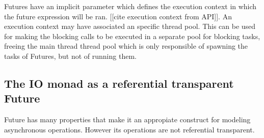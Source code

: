 \documentclass[../main.tex]{subfiles}
\begin{document}
Futures have an implicit parameter which defines the execution context in which
the future expression will be ran. [[cite execution context from API]]. An
execution context may have associated an specific thread pool. This can be used
for making the blocking calls to be executed in a separate pool for blocking
tasks, freeing the main thread thread pool which is only responsible of spawning the tasks
of Futures, but not of running them.

\subsection{The IO monad as a referential transparent Future}
Future has many properties that make it an appropiate construct for modeling
asynchronous operations. However its operations are not referential transparent.
\end{document}
